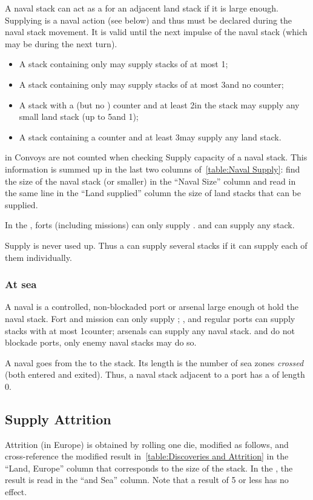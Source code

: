 A naval stack can act as a \SoS for an adjacent land stack if it is large
enough. Supplying is a naval action (see below) and thus must be declared
during the naval stack movement. It is valid until the next impulse of the
naval stack (which may be during the next turn).
\begin{itemize}
\item A stack containing only \NDE may supply stacks of at most 1\LD;
\item A stack containing only \ND may supply stacks of at most 3\LD and no
  \ARMY counter;
\item A stack with a \FLEET\facemoins (but no \FLEET\faceplus) counter and at
  least 2\ND in the stack may supply any small land stack (up to 5\LD and
  1\Pasha);
\item A stack containing a \FLEET\faceplus counter and at least 3\ND may
  supply any land stack.
\end{itemize}
\NTD in Convoys are not counted when checking Supply capacity of a naval
stack. This information is summed up in the last two columns
of~\ref{table:Naval Supply}: find the size of the naval stack (or smaller) in
the ``Naval Size'' column and read in the same line in the ``Land supplied''
column the size of land stacks that can be supplied.


In the \ROTW, forts (including missions) can only supply \LD. \TP and \COL can
supply any stack.

Supply is never used up. Thus a \SoS can supply several stacks if it can
supply each of them individually.

\subsubsection{At sea}
A naval \SoS is a controlled, non-blockaded port or arsenal large enough ot
hold the naval stack. Fort and mission can only supply \ND; \TP, \COL and
regular ports can supply stacks with at most 1\FLEET counter; arsenals can
supply any naval stack. \Presidios and \USURE do not blockade ports, only
enemy naval stacks may do so.

A naval \LoS goes from the \SoS to the stack. Its length is the number of sea
zones \emph{crossed} (both entered and exited). Thus, a naval stack adjacent
to a port has a \LoS of length 0.

\subsection{Supply Attrition}
Attrition (in Europe) is obtained by rolling one die, modified as follows, and
cross-reference the modified result in~\ref{table:Discoveries and
  Attrition} in the ``Land, Europe'' column that corresponds to the size of
the stack. In the \ROTW, the result is read in the ``\ROTW and Sea''
column. Note that a result of 5 or less has no effect.

